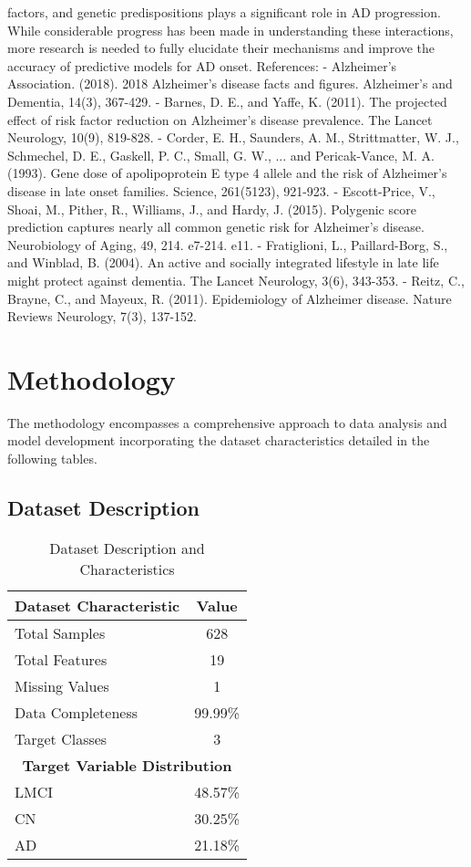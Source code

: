 \documentclass[conference]{IEEEtran}
\begin{document}
factors, and genetic predispositions plays a significant role in AD progression. While considerable progress has been made in understanding these interactions, more research is needed to fully elucidate their mechanisms and improve the accuracy of predictive models for AD onset. References: - Alzheimer's Association. (2018). 2018 Alzheimer's disease facts and figures. Alzheimer's and Dementia, 14(3), 367-429. - Barnes, D. E., and Yaffe, K. (2011). The projected effect of risk factor reduction on Alzheimer's disease prevalence. The Lancet Neurology, 10(9), 819-828. - Corder, E. H., Saunders, A. M., Strittmatter, W. J., Schmechel, D. E., Gaskell, P. C., Small, G. W., ... and Pericak-Vance, M. A. (1993). Gene dose of apolipoprotein E type 4 allele and the risk of Alzheimer's disease in late onset families. Science, 261(5123), 921-923. - Escott-Price, V., Shoai, M., Pither, R., Williams, J., and Hardy, J. (2015). Polygenic score prediction captures nearly all common genetic risk for Alzheimer's disease. Neurobiology of Aging, 49, 214. e7-214. e11. - Fratiglioni, L., Paillard-Borg, S., and Winblad, B. (2004). An active and socially integrated lifestyle in late life might protect against dementia. The Lancet Neurology, 3(6), 343-353. - Reitz, C., Brayne, C., and Mayeux, R. (2011). Epidemiology of Alzheimer disease. Nature Reviews Neurology, 7(3), 137-152.

\section{Methodology}
The methodology encompasses a comprehensive approach to data analysis and model development incorporating the dataset characteristics detailed in the following tables.

\subsection{Dataset Description}

\begin{table}[!h]
\centering
\caption{Dataset Description and Characteristics}
\label{tab:dataset_description}
\begin{tabular}{|l|c|}
\hline
\textbf{Dataset Characteristic} & \textbf{Value} \\
\hline
Total Samples & 628 \\
\hline
Total Features & 19 \\
\hline
Missing Values & 1 \\
\hline
Data Completeness & 99.99\% \\
\hline
Target Classes & 3 \\
\hline
\hline
\multicolumn{2}{|c|}{\textbf{Target Variable Distribution}} \\
\hline
LMCI & 48.57\% \\
\hline
CN & 30.25\% \\
\hline
AD & 21.18\% \\
\hline
\end{tabular}
\end{table}
\end{document}
